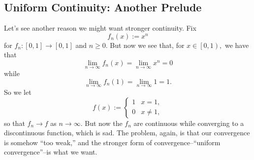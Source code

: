 \documentclass[../notes.tex]{subfiles}
\begin{document}
\subsection{Uniform Continuity: Another Prelude}
Let's see another reason we might want stronger continuity. Fix
\[f_n(x):=x^n\]
for $f_n:[0,1]\to[0,1]$ and $n\ge0.$ But now we see that, for $x\in\left[0,1\right),$ we have that
\[\lim_{n\to\infty}f_n(x)=\lim_{n\to\infty}x^n=0\]
while
\[\lim_{n\to\infty}f_n(1)=\lim_{n\to\infty}1=1.\]
So we let
\[f(x):=\begin{cases}
	1 & x=1, \\
	0 & x\ne1,
\end{cases}\]
so that $f_n\to f$ as $n\to\infty.$ But now the $f_n$ are continuous while converging to a discontinuous function, which is sad. The problem, again, is that our convergence is somehow ``too weak,'' and the stronger form of convergence--``uniform convergence''--is what we want.
\end{document}
